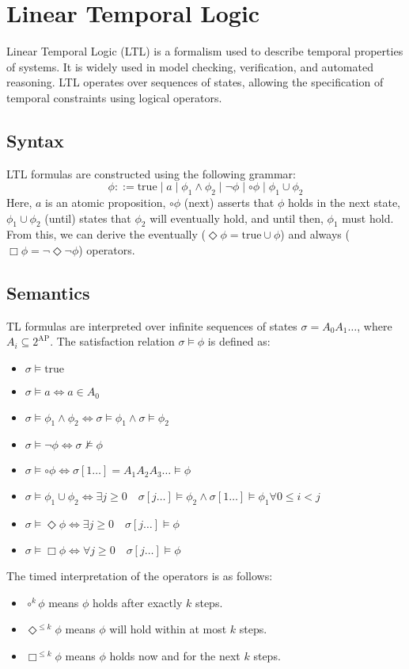 \section{Linear Temporal Logic}

Linear Temporal Logic (LTL) is a formalism used to describe temporal properties of systems. 
It is widely used in model checking, verification, and automated reasoning. 
LTL operates over sequences of states, allowing the specification of temporal constraints using logical operators.

\subsection{Syntax}
LTL formulas are constructed using the following grammar:
\[\phi::=\text{true}\mid a \mid \phi_1\land\phi_2\mid\lnot\phi\mid\circ \phi\mid\phi_1\cup\phi_2\]
\noindent Here, $a$ is an atomic proposition, $\circ\phi$ (next) asserts that $\phi$ holds in the next state, $\phi_1\cup\phi_2$ (until) states that $\phi_2$ will eventually hold, and until then, $\phi_1$ must hold.
From this, we can derive the eventually ($\Diamond\phi=\text{true}\cup\phi$) and always ($\Box\phi=\lnot\Diamond\lnot\phi$) operators.

\subsection{Semantics}
TL formulas are interpreted over infinite sequences of states $\sigma=A_0A_1\dots$, where $A_i \subseteq 2^{\text{AP}}$.
The satisfaction relation $\sigma\models\phi$ is defined as:
\begin{itemize}
    \item $\sigma\models\text{true}$
    \item $\sigma\models a \Leftrightarrow a\in A_0$
    \item $\sigma\models \phi_1\land\phi_2 \Leftrightarrow \sigma\models\phi_1 \land \sigma\models\phi_2$
    \item $\sigma\models \lnot\phi \Leftrightarrow \sigma\not\models\phi$
    \item $\sigma\models \circ \phi \Leftrightarrow \sigma[1\dots]=A_1A_2A_3\dots\models\phi$
    \item $\sigma\models \phi_1\cup\phi_2 \Leftrightarrow \exists j \geq 0\quad\sigma[j\dots]\models\phi_2 \land \sigma[1\dots]\models\phi_1\forall 0\leq i<j$
    \item $\sigma\models\Diamond\phi \Leftrightarrow \exists j\geq 0 \quad \sigma[j\dots]\models\phi$
    \item $\sigma\models\Box\phi \Leftrightarrow \forall j\geq 0 \quad \sigma[j\dots]\models\phi$
\end{itemize}
\noindent The timed interpretation of the operators is as follows: 
\begin{itemize}
    \item $\circ^k\phi$ means $\phi$ holds after exactly $k$ steps. 
    \item $\Diamond^{\leq k}\phi$ means $\phi$ will hold within at most $k$ steps. 
    \item $\Box^{\leq k}\phi$ means $\phi$ holds now and for the next $k$ steps.
\end{itemize}

